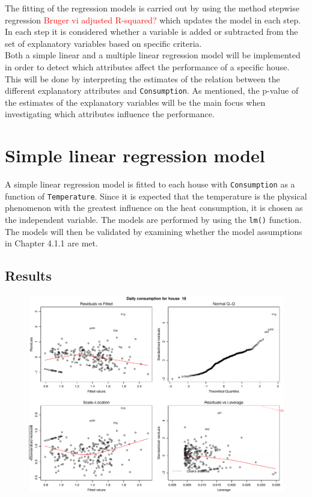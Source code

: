 \noindent The fitting of the regression models is carried out by using the method stepwise regression \textcolor{red}{Bruger vi adjusted R-squared?} which updates the model in each step. In each step it is considered whether a variable is added or subtracted from the set of explanatory variables based on specific criteria. \\

\noindent Both a simple linear and a multiple linear regression model will be implemented in order to detect which attributes affect the performance of a specific house. This will be done by interpreting the estimates of the relation between the different explanatory attributes and \texttt{Consumption}. As mentioned, the p-value of the estimates of the explanatory variables will be the main focus when investigating which attributes influence the performance.

\section{Simple linear regression model}
A simple linear regression model is fitted to each house with \texttt{Consumption} as a function of \texttt{Temperature}. Since it is expected that the temperature is the physical phenomenon with the greatest influence on the heat consumption, it is chosen as the independent variable. The models are performed by using the \texttt{lm()} function. The models will then be validated by examining whether the model assumptions in Chapter 4.1.1 are met. \\

\noindent

\subsection{Results}
\begin{figure}
    \centering
    \includegraphics[width=.8\textwidth]{../../../figures/simple_lm18.pdf}
    \caption{}
    \label{fig: simple_lm_18}
\end{figure}

